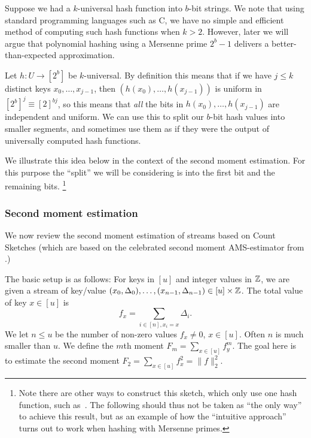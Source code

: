 Suppose we had a $k$-universal hash function into $b$-bit strings.
We note that using standard programming languages such as C, we have
no simple and efficient method of computing such hash
functions when $k>2$. However, later we will argue that polynomial
hashing using a Mersenne prime $2^b-1$ delivers a better-than-expected
approximation.

Let $h:U\to [2^b]$ be $k$-universal. By definition this
means that if we have $j\leq k$ distinct keys $x_0,\ldots,x_{j - 1}$, then
$(h(x_0),\ldots,h(x_{j - 1}))$ is uniform in $[2^b]^j\equiv [2]^{bj}$,
so this means that \emph{all} the bits in $h(x_0),\ldots,h(x_{j - 1})$ are
independent and uniform. We can use this to split our $b$-bit hash
values into smaller segments, and sometimes use them as if
they were the output of universally computed hash functions.

We illustrate this idea below in the context of the second moment estimation.
For this purpose the ``split'' we will be considering is into the first bit and the remaining bits.
\footnote{Note there are other ways to construct this sketch, which only use one hash function, such as~\cite{thorup12kwise}.
The following should thus not be taken as ``the only way'' to achieve this result, but as an example of how the ``intuitive approach'' turns out to work when hashing with Mersenne primes.}

\subsubsection{Second moment estimation}\label{sec:count-sketch}
We now review the second moment estimation of streams based on Count Sketches \cite{charikar04count-sketch} (which are based on the
celebrated second moment AMS-estimator from \cite{alon96frequency}.)

The basic setup is as follows:
For keys in $[u]$ and integer values in $\mathbb Z$, we are given a stream of key/value $(x_0,\Delta_0),\ldots, (x_{n-1},\Delta_{n-1})\in [u]\times\mathbb Z$. The
total value of key $x\in[u]$ is
\[f_x=\sum_{i\in[n],x_i=x} \Delta_i.\]
We let $n\leq u$ be  the number of non-zero values
$f_x\neq 0$, $x\in [u]$. Often $n$ is much smaller than $u$.
We define the $m$th moment $F_m = \sum_{x\in [u]}f_y^m$. The goal here is to
estimate the second moment $F_2 = \sum_{x\in [u]}f_x^2=\|f\|^2_2$.

